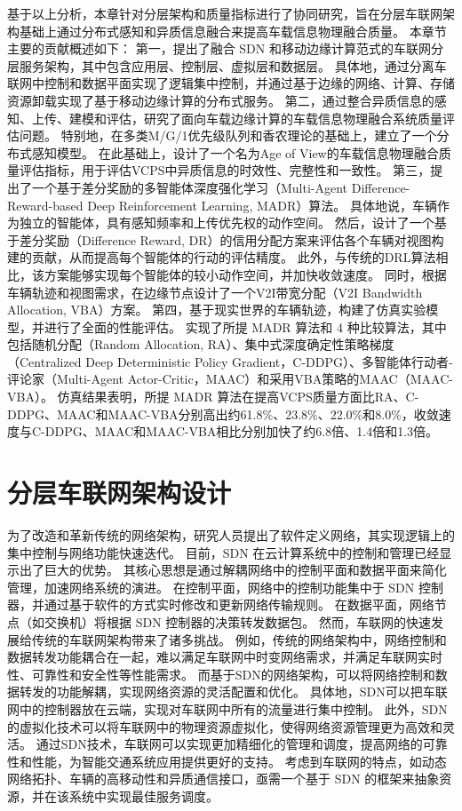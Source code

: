 基于以上分析，本章针对分层架构和质量指标进行了协同研究，旨在分层车联网架构基础上通过分布式感知和异质信息融合来提高车载信息物理融合质量。
本章节主要的贡献概述如下：
第一，提出了融合 SDN 和移动边缘计算范式的车联网分层服务架构，其中包含应用层、控制层、虚拟层和数据层。
具体地，通过分离车联网中控制和数据平面实现了逻辑集中控制，并通过基于边缘的网络、计算、存储资源卸载实现了基于移动边缘计算的分布式服务。
第二，通过整合异质信息的感知、上传、建模和评估，研究了面向车载边缘计算的车载信息物理融合系统质量评估问题。
特别地，在多类M/G/1优先级队列和香农理论的基础上，建立了一个分布式感知模型。
在此基础上，设计了一个名为Age of View的车载信息物理融合质量评估指标，用于评估VCPS中异质信息的时效性、完整性和一致性。
第三，提出了一个基于差分奖励的多智能体深度强化学习（Multi-Agent Difference-Reward-based Deep Reinforcement Learning, MADR）算法。
具体地说，车辆作为独立的智能体，具有感知频率和上传优先权的动作空间。
然后，设计了一个基于差分奖励（Difference Reward, DR）的信用分配方案来评估各个车辆对视图构建的贡献，从而提高每个智能体的行动的评估精度。
此外，与传统的DRL算法相比，该方案能够实现每个智能体的较小动作空间，并加快收敛速度。
同时，根据车辆轨迹和视图需求，在边缘节点设计了一个V2I带宽分配（V2I Bandwidth Allocation, VBA）方案。
第四，基于现实世界的车辆轨迹，构建了仿真实验模型，并进行了全面的性能评估。
实现了所提 MADR 算法和 4 种比较算法，其中包括随机分配（Random Allocation, RA）、集中式深度确定性策略梯度（Centralized Deep Deterministic Policy Gradient，C-DDPG）\cite{mlika2022deep}、多智能体行动者-评论家（Multi-Agent Actor-Critic，MAAC）\cite{he2021efficient}和采用VBA策略的MAAC（MAAC-VBA）。
仿真结果表明，所提 MADR 算法在提高VCPS质量方面比RA、C-DDPG、MAAC和MAAC-VBA分别高出约61.8\%、23.8\%、22.0\%和8.0\%，收敛速度与C-DDPG、MAAC和MAAC-VBA相比分别加快了约6.8倍、1.4倍和1.3倍。

\section{分层车联网架构设计}\label{section 2-2}

为了改造和革新传统的网络架构，研究人员提出了软件定义网络\cite{wang2020ji}，其实现逻辑上的集中控制与网络功能快速迭代。
目前，SDN 在云计算系统中的控制和管理已经显示出了巨大的优势\cite{jain2013network}。
其核心思想是通过解耦网络中的控制平面和数据平面来简化管理，加速网络系统的演进。
在控制平面，网络中的控制功能集中于 SDN 控制器，并通过基于软件的方式实时修改和更新网络传输规则。
在数据平面，网络节点（如交换机）将根据 SDN 控制器的决策转发数据包。
然而，车联网的快速发展给传统的车联网架构带来了诸多挑战。
例如，传统的网络架构中，网络控制和数据转发功能耦合在一起，难以满足车联网中时变网络需求，并满足车联网实时性、可靠性和安全性等性能需求。
而基于SDN的网络架构，可以将网络控制和数据转发的功能解耦，实现网络资源的灵活配置和优化。
具体地，SDN可以把车联网中的控制器放在云端，实现对车联网中所有的流量进行集中控制。
此外，SDN的虚拟化技术可以将车联网中的物理资源虚拟化，使得网络资源管理更为高效和灵活。
通过SDN技术，车联网可以实现更加精细化的管理和调度，提高网络的可靠性和性能，为智能交通系统应用提供更好的支持。
考虑到车联网的特点，如动态网络拓扑、车辆的高移动性和异质通信接口，亟需一个基于 SDN 的框架来抽象资源，并在该系统中实现最佳服务调度。


